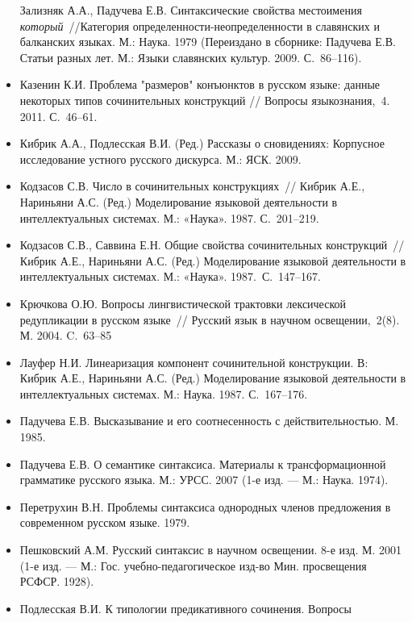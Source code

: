 \begin{itemize}
        Зализняк А.А., Падучева Е.В. Синтаксические свойства местоимения
        \textit{который}~//Категория определенности-неопределенности в
        славянских и балканских языках. М.: Наука. 1979 (Переиздано в
        сборнике: Падучева Е.В. Статьи разных лет. М.: Языки славянских
        культур. 2009. С.~86--116).
  \item
        Казенин К.И. Проблема "размеров" конъюнктов в русском языке: данные
        некоторых типов сочинительных конструкций // Вопросы языкознания,~4.
        2011. С.~46--61.
  \item
        Кибрик А.А., Подлесская В.И. (Ред.) Рассказы о сновидениях: Корпусное
        исследование устного русского дискурса. М.: ЯСК. 2009.
  \item
        Кодзасов С.В. Число в сочинительных конструкциях~// Кибрик А.Е.,
        Нариньяни А.С. (Ред.) Моделирование языковой деятельности в
        интеллектуальных системах. М.: «Наука». 1987. С.~201--219.
  \item
        Кодзасов С.В., Саввина Е.Н. Общие свойства сочинительных
        конструкций~// Кибрик А.Е., Нариньяни А.С. (Ред.) Моделирование
        языковой деятельности в интеллектуальных системах. М.: «Наука».
        1987.~С.~147--167.
  \item
        Крючкова О.Ю. Вопросы лингвистической трактовки лексической
        редупликации в русском языке~// Русский язык в научном
        освещении,~2(8). М. 2004. C.~63--85
  \item
        Лауфер Н.И. Линеаризация компонент сочинительной конструкции. В:
        Кибрик А.Е., Нариньяни А.С. (Ред.) Моделирование языковой деятельности
        в интеллектуальных системах. М.: Наука. 1987. С.~167--176.
  \item
        Падучева Е.В. Высказывание и его соотнесенность с действительностью.
        М. 1985.
  \item
        Падучева Е.В. О семантике синтаксиса. Материалы к трансформационной
        грамматике русского языка. М.: УРСС. 2007 (1-е изд. --- М.: Наука.
        1974).
  \item
        Перетрухин В.Н. Проблемы синтаксиса однородных членов предложения в
        современном русском языке. 1979.
  \item
        Пешковский А.М. Русский синтаксис в научном освещении. 8-е изд. М.
        2001 (1-е изд. --- М.: Гос. учебно-педагогическое изд-во Мин.
        просвещения РСФСР. 1928).
  \item
        Подлесская В.И. К типологии предикативного сочинения. Вопросы

\end{itemize}
